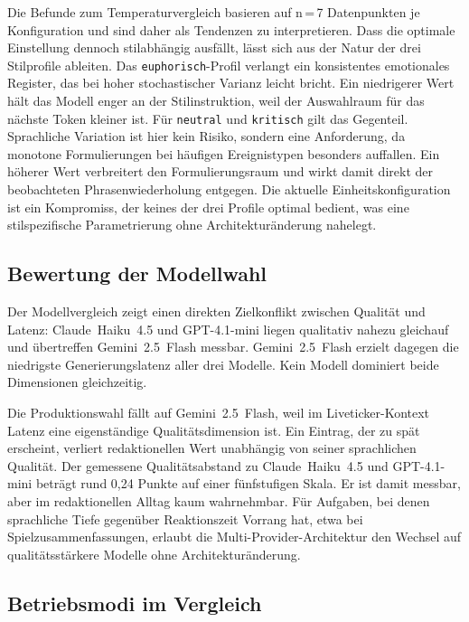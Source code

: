 Die Befunde zum Temperaturvergleich basieren auf n\,=\,7 Datenpunkten je Konfiguration und sind daher als Tendenzen zu interpretieren. Dass die optimale Einstellung dennoch stilabhängig ausfällt, lässt sich aus der Natur der drei Stilprofile ableiten. Das \texttt{euphorisch}-Profil verlangt ein konsistentes emotionales Register, das bei hoher stochastischer Varianz leicht bricht. Ein niedrigerer Wert hält das Modell enger an der Stilinstruktion, weil der Auswahlraum für das nächste Token kleiner ist. Für \texttt{neutral} und \texttt{kritisch} gilt das Gegenteil. Sprachliche Variation ist hier kein Risiko, sondern eine Anforderung, da monotone Formulierungen bei häufigen Ereignistypen besonders auffallen. Ein höherer Wert verbreitert den Formulierungsraum und wirkt damit direkt der beobachteten Phrasenwiederholung entgegen. Die aktuelle Einheitskonfiguration ist ein Kompromiss, der keines der drei Profile optimal bedient, was eine stilspezifische Parametrierung ohne Architekturänderung nahelegt.

\subsection{Bewertung der Modellwahl}\label{modellauswahl}

Der Modellvergleich zeigt einen direkten Zielkonflikt zwischen Qualität und Latenz: Claude~Haiku~4.5 und GPT-4.1-mini liegen qualitativ nahezu gleichauf und übertreffen Gemini~2.5~Flash messbar. Gemini~2.5~Flash erzielt dagegen die niedrigste Generierungslatenz aller drei Modelle. Kein Modell dominiert beide Dimensionen gleichzeitig.

Die Produktionswahl fällt auf Gemini~2.5~Flash, weil im Liveticker-Kontext Latenz eine eigenständige Qualitätsdimension ist. Ein Eintrag, der zu spät erscheint, verliert redaktionellen Wert unabhängig von seiner sprachlichen Qualität. Der gemessene Qualitätsabstand zu Claude~Haiku~4.5 und GPT-4.1-mini beträgt rund 0{,}24 Punkte auf einer fünfstufigen Skala. Er ist damit messbar, aber im redaktionellen Alltag kaum wahrnehmbar. Für Aufgaben, bei denen sprachliche Tiefe gegenüber Reaktionszeit Vorrang hat, etwa bei Spielzusammenfassungen, erlaubt die Multi-Provider-Architektur den Wechsel auf qualitätsstärkere Modelle ohne Architekturänderung.

\subsection{Betriebsmodi im Vergleich}\label{diskussion-der-betriebsmodi}

